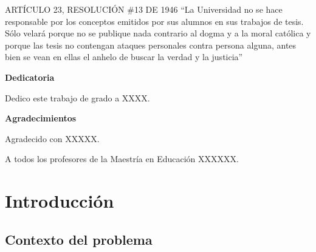 \documentclass{book}
\begin{document}
ARTÍCULO 23, RESOLUCIÓN \#13 DE 1946 “La Universidad no se hace responsable por los conceptos emitidos por sus alumnos en sus trabajos de tesis. Sólo velará porque no se publique nada contrario al dogma y a la moral católica y porque las tesis no contengan ataques personales contra persona alguna, antes bien se vean en ellas el anhelo de buscar la verdad y la justicia” 
\newpage

\begin{center}\textbf{Dedicatoria}\end{center}
\vspace{1mm} %
\begin{center}Dedico este trabajo de grado a XXXX.\end{center} 
\newpage
\begin{center}\textbf{Agradecimientos}\end{center}
\vspace{1mm} %
\begin{center}Agradecido con XXXXX.  \end{center}
\begin{center}A todos los profesores de la Maestría en Educación XXXXXX.\end{center}
\newpage
\tableofcontents
\listoffigures
\listoftables
\chapter{Introducción}

\section{Contexto del problema}
\end{document}
